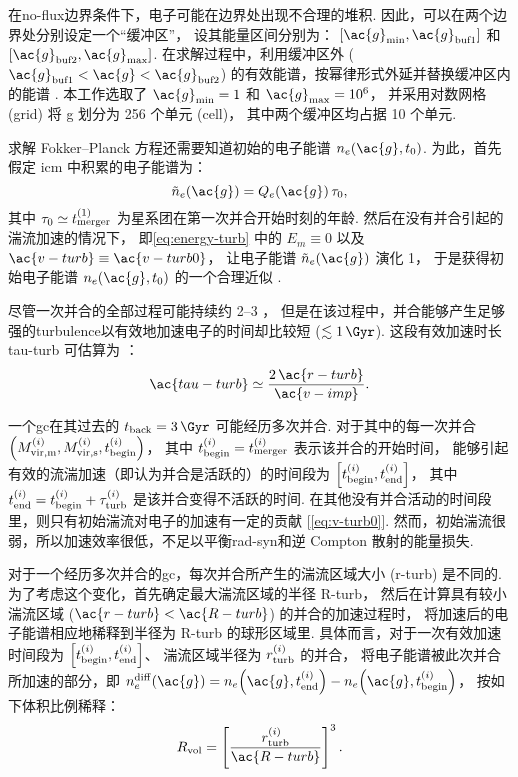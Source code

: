 在\ac{no-flux}边界条件下，电子可能在边界处出现不合理的堆积.
因此，可以在两个边界处分别设定一个\enquote{缓冲区}，
设其能量区间分别为：
$[\ac{g}_{\R{min}}, \ac{g}_{\R{buf1}}]$ 和
$[\ac{g}_{\R{buf2}}, \ac{g}_{\R{max}}]$.
在求解过程中，利用缓冲区外 ($\ac{g}_{\R{buf1}} < \ac{g} < \ac{g}_{\R{buf2}}$)
的有效能谱，按幂律形式外延并替换缓冲区内的能谱 \cite{borovsky1986,donnert2014}.
本工作选取了 $\ac{g}_{\R{min}} = 1$ 和 $\ac{g}_{\R{max}} = \num{e6}$，
并采用对数网格 (grid) 将 \ac{g} 划分为 256 个单元 (cell)，
其中两个缓冲区均占据 10 个单元.

求解 Fokker--Planck 方程还需要知道初始的电子能谱 $n_e(\ac{g}, t_0)$.
为此，首先假定 \ac{icm} 中积累的电子能谱为：
\begin{equation}
  \tilde{n}_e(\ac{g}) = Q_e(\ac{g}) \,\tau_0 ,
\end{equation}
其中 $\tau_0 \simeq t_{\mathrm{merger}}^{(1)}$ 为星系团在第一次并合开始时刻的年龄.
然后在没有并合引起的湍流加速的情况下，
即\autoref{eq:energy-turb} 中的 $E_m \equiv 0$ 以及
$\ac{v-turb} \equiv \ac{v-turb0}$，
让电子能谱 $\tilde{n}_e(\ac{g})$ 演化 \SI{1}{\Gyr}，
于是获得初始电子能谱 $n_e(\ac{g}, t_0)$ 的一个合理近似 \cite{brunetti2007}.

尽管一次并合的全部过程可能持续约 \SIrange{2}{3}{\Gyr} \cite{tormen2004,cassano2016}，
但是在该过程中，并合能够产生足够强的\ac{turbulence}以有效地加速电子的时间却比较短
($\lesssim \SI{1}{\Gyr}$).
这段有效加速时长 \ac{tau-turb} 可估算为 \cite{miniati2015}：
\begin{equation}
  \ac{tau-turb} \simeq \frac{2\,\ac{r-turb}}{\ac{v-imp}} .
\end{equation}

一个\ac{gc}在其过去的 $t_{\R{back}} = \SI{3}{\Gyr}$ 可能经历多次并合.
对于其中的每一次并合
$\left( M^{(i)}_{\mathrm{vir,m}}, M^{(i)}_{\mathrm{vir,s}}, t^{(i)}_{\mathrm{begin}} \right)$，
其中 $t^{(i)}_{\mathrm{begin}} = t^{(i)}_{\mathrm{merger}}$ 表示该并合的开始时间，
能够引起有效的流湍加速（即认为并合是活跃的）的时间段为
$\left[ t^{(i)}_{\mathrm{begin}}, t^{(i)}_{\mathrm{end}} \right]$，
其中 $t^{(i)}_{\mathrm{end}} = t^{(i)}_{\mathrm{begin}}+\tau^{(i)}_{\mathrm{turb}}$
是该并合变得不活跃的时间.
在其他没有并合活动的时间段里，则只有初始湍流对电子的加速有一定的贡献
[\autoref{eq:v-turb0}].
然而，初始湍流很弱，所以加速效率很低，不足以平衡\ac{rad-syn}和逆 Compton 散射的能量损失.

对于一个经历多次并合的\ac{gc}，每次并合所产生的湍流区域大小 (\ac{r-turb}) 是不同的.
为了考虑这个变化，首先确定最大湍流区域的半径 \ac{R-turb}，
然后在计算具有较小湍流区域 ($\ac{r-turb} < \ac{R-turb}$) 的并合的加速过程时，
将加速后的电子能谱相应地稀释到半径为 \ac{R-turb} 的球形区域里.
具体而言，对于一次有效加速时间段为
$\left[ t^{(i)}_{\mathrm{begin}}, t^{(i)}_{\mathrm{end}} \right]$、
湍流区域半径为 $r^{(i)}_{\mathrm{turb}}$ 的并合，
将电子能谱被此次并合所加速的部分，即
$n_e^{\R{diff}}(\ac{g}) =
n_e\!\left(\ac{g}, t^{(i)}_{\R{end}}\right) -
n_e\!\left(\ac{g}, t^{(i)}_{\R{begin}}\right)$，
按如下体积比例稀释：
\begin{equation}
  \label{eq:ratio-v}
  R_{\R{vol}} = \left[ \frac{r^{(i)}_{\R{turb}}}{\ac{R-turb}} \right]^3 .
\end{equation}

